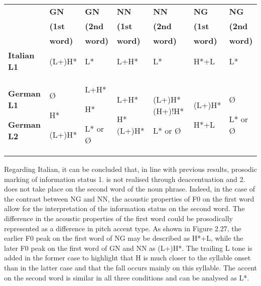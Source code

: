 \begin{flushleft}
\tablefirsthead{}
\tablehead{}
\tabletail{}
\tablelasttail{}
\begin{supertabular}{m{0.9038598in}m{0.68865985in}m{0.58585984in}m{0.5802598in}m{0.6441598in}m{0.5879598in}m{0.5379598in}}
\hline
 &
\textbf{GN} &
\textbf{GN} &
\textbf{NN} &
\textbf{NN} &
\textbf{NG} &
\textbf{NG}\\\hhline{-~~~~~~}
 &
\textbf{(1st} &
\textbf{(2nd} &
\textbf{(1st} &
\textbf{(2nd} &
\textbf{(1st} &
\textbf{(2nd}\\\hhline{-~~~~~~}
 &
\textbf{word)} &
\textbf{word)} &
\textbf{word)} &
\textbf{word)} &
\textbf{word)} &
\textbf{word)}\\\hline
\textbf{Italian L1} &
(L+)H* &
L* &
L+H* &
L* &
H*+L &
L*\\
\textbf{German L1}

\textbf{German L2} &
Ø

H* 

(L+)H* &
L+H*

H*

L* or Ø &
L+H*

H* (L+)H* &
(L+)H* (H+)!H*

L* or Ø &
(L+)H*

H*+L &
Ø

L* or Ø\\\hline
\end{supertabular}
\end{flushleft}
\begin{styleStandard}
Regarding Italian, it can be concluded that, in line with previous results, prosodic marking of information status 1. is not realised through deaccentuation and 2. does not take place on the second word of the noun phrase. Indeed, in the case of the contrast between NG and NN, the acoustic properties of F0 on the first word allow for the interpretation of the information status on the second word. The difference in the acoustic properties of the first word could be prosodically represented as a difference in pitch accent type. As shown in Figure 2.27, the earlier F0 peak on the first word of NG may be described as H*+L, while the later F0 peak on the first word of GN and NN as (L+)H*. The trailing L tone is added in the former case to highlight that H is much closer to the syllable onset than in the latter case and that the fall occurs mainly on this syllable. The accent on the second word is similar in all three conditions and can be analysed as L*.
\end{styleStandard}

